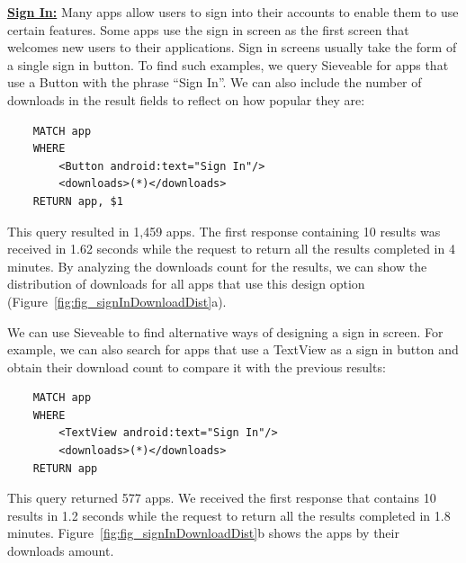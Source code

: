\underline{\textbf{Sign In:}}
Many apps allow users to sign into their accounts to enable them to use certain features.
Some apps use the sign in screen as the first screen that welcomes new users to their applications.
Sign in screens usually take the form of a single sign in button.
To find such examples, we query Sieveable for apps that use a Button with the phrase ``Sign In''. 
We can also include the number of downloads in the result fields to reflect on how popular they are:
\begin{verbatim}
    MATCH app
    WHERE
        <Button android:text="Sign In"/>
        <downloads>(*)</downloads>
    RETURN app, $1
\end{verbatim}
This query resulted in 1,459 apps. The first response containing 10 results was received in 1.62 seconds while the request to return all the results completed in 4 minutes. By analyzing the downloads count for the results, we can show the distribution of downloads for all apps that use this design option (Figure~\ref{fig:fig_signInDownloadDist}a).

We can use Sieveable to find alternative ways of designing a sign in screen.
For example, we can also search for apps that use a TextView as a sign in button and obtain their download count to compare it with the previous results:
\begin{verbatim}
    MATCH app
    WHERE
        <TextView android:text="Sign In"/>
        <downloads>(*)</downloads>
    RETURN app
\end{verbatim}
This query returned 577 apps.
We received the first response that contains 10 results in 1.2 seconds while the request to return all the results completed in 1.8 minutes. Figure~\ref{fig:fig_signInDownloadDist}b shows the apps by their downloads amount.

